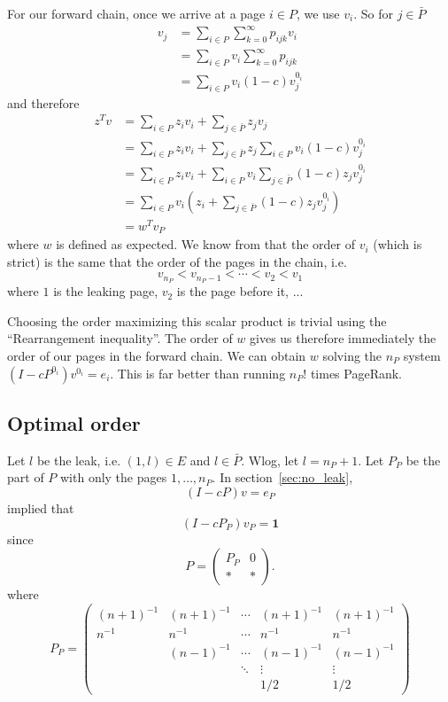 \documentclass{article}
\newcommand{\1}{\mathbf{1}}
\theoremstyle{definition}
\begin{document}
For our forward chain,
once we arrive at a page $i \in P$, we use $v_i$.
So for $j \in \bar{P}$
\begin{align*}
  v_j & = \sum_{i \in P} \sum_{k = 0}^\infty p_{ijk} v_i\\
      & = \sum_{i \in P} v_i \sum_{k = 0}^\infty p_{ijk}\\
      & = \sum_{i \in P} v_i (1-c) v_j^{0_i}
\end{align*}
and therefore
\begin{align*}
  z^T v
  & = \sum_{i \in P} z_i v_i + \sum_{j \in \bar{P}} z_j v_j\\
  & = \sum_{i \in P} z_i v_i + \sum_{j \in \bar{P}} z_j\sum_{i \in P} v_i (1-c) v_j^{0_i}\\
  & = \sum_{i \in P} z_i v_i + \sum_{i \in P} v_i \sum_{j \in \bar{P}} (1-c) z_j v_j^{0_i}\\
  & = \sum_{i \in P} v_i \left(z_i + \sum_{j \in \bar{P}} (1-c) z_jv_j^{0_i}\right)\\
  & = w^T v_P
\end{align*}
where $w$ is defined as expected.
We know from \cite{de2008maximizing} that the order of $v_i$ (which is strict) is the same that
the order of the pages in the chain, i.e.
\[ v_{n_P} < v_{n_P-1} < \cdots < v_2 < v_1 \]
where $1$ is the leaking page, $v_2$ is the page before it, ...

Choosing the order maximizing this scalar product is trivial using the ``Rearrangement inequality''.
The order of $w$ gives us therefore immediately the order of our pages in the forward chain.
We can obtain $w$ solving the $n_P$ system $(I - cP^{0_i})v^{0_i} = e_i$.
This is far better than running $n_P!$ times PageRank.

\subsection{Optimal order}
Let $l$ be the leak, i.e. $(1,l) \in E$ and $l \in \bar{P}$.
Wlog, let $l = n_{P}+1$.
Let $P_P$ be the part of $P$ with only the pages $1, \ldots, n_P$.
In section~\ref{sec:no_leak},
\[ (I - cP)v = e_P \]
implied that
\[ (I - cP_P)v_P = \1 \]
since
\[ P =
  \begin{pmatrix}
    P_P & 0\\
    * & *
  \end{pmatrix}.
\]
where
\[
  P_P =
  \begin{pmatrix}
    (n+1)^{-1} & (n+1)^{-1} & \cdots & (n+1)^{-1} & (n+1)^{-1}\\
    n^{-1} & n^{-1} & \cdots & n^{-1} & n^{-1}\\
           & (n-1)^{-1} & \cdots & (n-1)^{-1} & (n-1)^{-1}\\
           & & \ddots & \vdots & \vdots\\
    & & & 1/2 & 1/2
  \end{pmatrix}
\]
\end{document}
